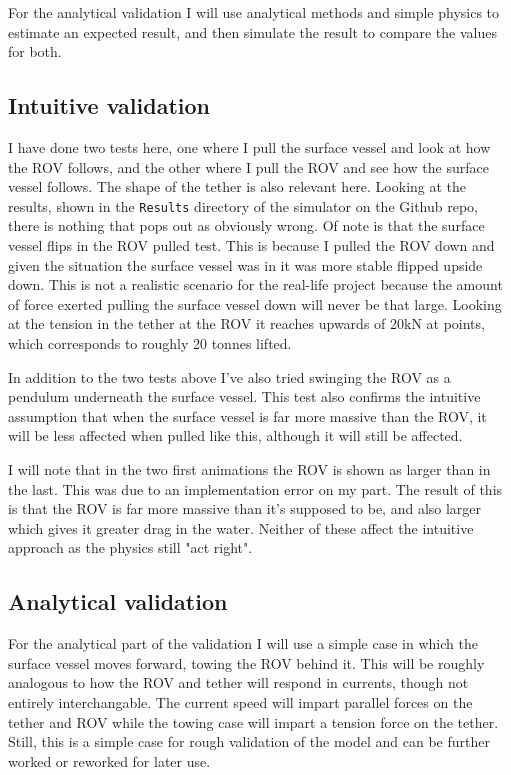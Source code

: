 For the analytical validation I will use analytical methods and simple physics to estimate an expected result, and then simulate the result to compare the values for both.

\subsection{Intuitive validation}
I have done two tests here, one where I pull the surface vessel and look at how the ROV follows, and the other where I pull the ROV and see how the surface vessel follows. The shape of the tether is also relevant here. Looking at the results, shown in the \texttt{Results} directory of the simulator on the Github repo, there is nothing that pops out as obviously wrong. Of note is that the surface vessel flips in the ROV pulled test. This is because I pulled the ROV down and given the situation the surface vessel was in it was more stable flipped upside down. This is not a realistic scenario for the real-life project because the amount of force exerted pulling the surface vessel down will never be that large. Looking at the tension in the tether at the ROV it reaches upwards of 20kN at points, which corresponds to roughly 20 tonnes lifted.

In addition to the two tests above I've also tried swinging the ROV as a pendulum underneath the surface vessel. This test also confirms the intuitive assumption that when the surface vessel is far more massive than the ROV, it will be less affected when pulled like this, although it will still be affected. 

I will note that in the two first animations the ROV is shown as larger than in the last. This was due to an implementation error on my part. The result of this is that the ROV is far more massive than it's supposed to be, and also larger which gives it greater drag in the water. Neither of these affect the intuitive approach as the physics still "act right". 

\subsection{Analytical validation}
\label{sec:anal}
For the analytical part of the validation I will use a simple case in which the surface vessel moves forward, towing the ROV behind it. This will be roughly analogous to how the ROV and tether will respond in currents, though not entirely interchangable. The current speed will impart parallel forces on the tether and ROV while the towing case will impart a tension force on the tether. Still, this is a simple case for rough validation of the model and can be further worked or reworked for later use.

